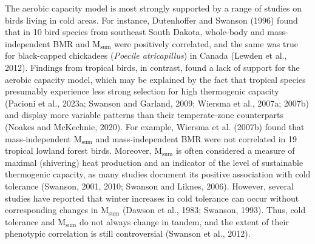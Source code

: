 \documentclass[10pt, twoside]{book} %
\begin{document}
The aerobic capacity model is most strongly supported by a range of studies on birds living in cold areas. For instance, Dutenhoffer and Swanson (1996) found that in 10 bird species from southeast South Dakota, whole-body and mass-independent BMR and M$_{\text{sum}}$ were positively correlated, and the same was true for black-capped chickadees (\textit{Poecile atricapillus}) in Canada (Lewden et al., 2012). Findings from tropical birds, in contrast, found a lack of support for the aerobic capacity model, which may be explained by the fact that tropical species presumably experience less strong selection for high thermogenic capacity (Pacioni et al., 2023a; Swanson and Garland, 2009; Wiersma et al., 2007a; 2007b) and display more variable patterns than their temperate-zone counterparts (Noakes and McKechnie, 2020). For example, Wiersma et al. (2007b) found that mass-independent M$_{\text{sum}}$ and mass-independent BMR were not correlated in 19 tropical lowland forest birds. Moreover, M$_{\text{sum}}$ is often considered a measure of maximal (shivering) heat production and an indicator of the level of sustainable thermogenic capacity, as many studies document its positive association with cold tolerance (Swanson, 2001, 2010; Swanson and Liknes, 2006). However, several studies have reported that winter increases in cold tolerance can occur without corresponding changes in M$_{\text{sum}}$ (Dawson et al., 1983; Swanson, 1993). Thus, cold tolerance and M$_{\text{sum}}$ do not always change in tandem, and the extent of their phenotypic correlation is still controversial (Swanson et al., 2012).\\
\end{document}
